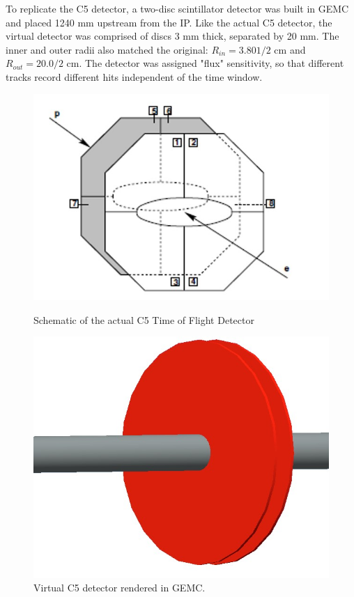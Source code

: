 To replicate the C5 detector, a two-disc scintillator detector was built in GEMC and placed 1240 mm upstream from the IP.  Like the actual C5 detector, the virtual detector was comprised of discs 3 mm thick, separated by 20 mm.  The inner and outer radii also matched the original: $R_{in} = 3.801/2$ cm and $R_{out} = 20.0/2$ cm.  The detector was assigned "flux" sensitivity, so that different tracks record different hits independent of the time window. 
\begin{figure}[!htb]
	\centering
	\begin{minipage}{0.45\textwidth}
		\centering
		\includegraphics[width=.8\textwidth]{../../img/hera_c5.jpg}
		\caption {Schematic of the actual C5 Time of Flight Detector  }
		\label{fig:hera5}
	\end{minipage}\hfill
	\begin{minipage}{0.45\textwidth}
		\centering	\includegraphics[width=.75\textwidth]{../../img/C5_gemc}	
		\caption {Virtual C5 detector rendered in GEMC.}
		\label{fig:hera6}
	\end{minipage}
\end{figure}

